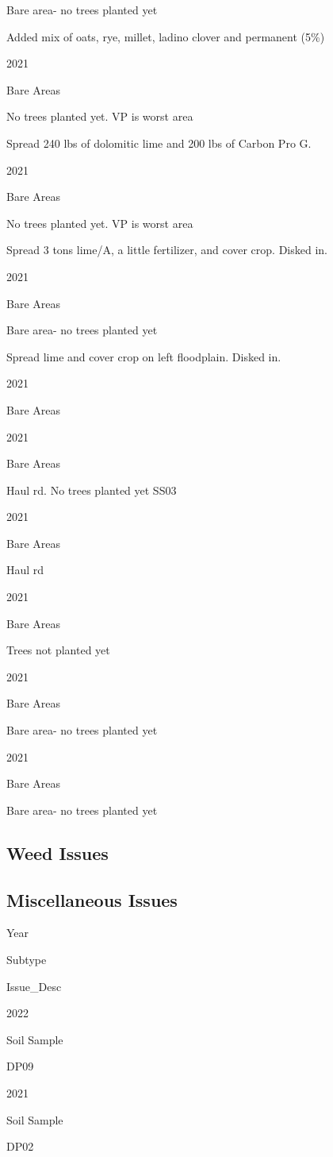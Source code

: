 \documentclass[
  landscape]{article}
\begin{document}
Bare area- no trees planted yet

Added mix of oats, rye, millet, ladino clover and permanent (5\%)

2021

Bare Areas

No trees planted yet. VP is worst area

Spread 240 lbs of dolomitic lime and 200 lbs of Carbon Pro G.

2021

Bare Areas

No trees planted yet. VP is worst area

Spread 3 tons lime/A, a little fertilizer, and cover crop. Disked in.

2021

Bare Areas

Bare area- no trees planted yet

Spread lime and cover crop on left floodplain. Disked in.

2021

Bare Areas

2021

Bare Areas

Haul rd. No trees planted yet SS03

2021

Bare Areas

Haul rd

2021

Bare Areas

Trees not planted yet

2021

Bare Areas

Bare area- no trees planted yet

2021

Bare Areas

Bare area- no trees planted yet

\hypertarget{weed-issues}{%
\subsection{Weed Issues}\label{weed-issues}}

\hypertarget{miscellaneous-issues}{%
\subsection{Miscellaneous Issues}\label{miscellaneous-issues}}

Year

Subtype

Issue\_Desc

2022

Soil Sample

DP09

2021

Soil Sample

DP02
\end{document}
